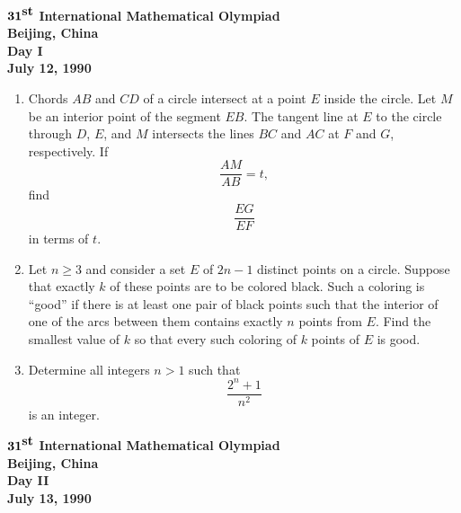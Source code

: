 \documentclass[12pt]{article}
\begin{document}
\begin{center}
${\bf 31}^{\mbox{\bf st}}$ {\bf International
Mathematical Olympiad} \\[.1in]
{\bf Beijing, China} \\ [.05in]
{\bf Day I}\\[.05in]
{\bf July 12, 1990}
\end{center}

\vspace*{.3in}

\begin{enumerate}
\item Chords $AB$ and $CD$ of a circle intersect at a point $E$ inside the
circle.  Let $M$ be an interior point of the segment $EB$.  The tangent line at
$E$ to the circle through $D$, $E$, and $M$ intersects the lines $BC$ and $AC$
at $F$ and $G$, respectively.  If
$$\frac{AM}{AB} = t,$$
find
$$\frac{EG}{EF}$$
in terms of $t$.

\item
Let $n \geq 3$ and consider a set $E$ of $2n - 1$ distinct points on a circle.
Suppose that exactly $k$ of these points are to be colored black.  Such a
coloring is ``good'' if there is at least one pair of black points such that
the interior of one of the arcs between them contains exactly $n$ points from
$E$.  Find the smallest value of $k$ so that every such coloring of $k$ points
of $E$ is good.

\item
Determine all integers $n > 1$ such that 
$$\frac{2^n + 1}{n^2}$$
is an integer.

\end{enumerate}

\pagebreak %
\begin{center}
${\bf 31}^{\mbox{\bf st}}$ {\bf International
Mathematical Olympiad} \\[.1in]
{\bf Beijing, China} \\ [.05in]
{\bf Day II}\\[.05in]
{\bf July 13, 1990}
\end{center}

\vspace*{.3in}
\end{document}
